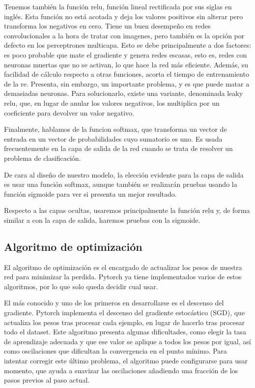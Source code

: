 Tenemos también la función relu, función lineal rectificada por sus
siglas en inglés. Esta función no está acotada y deja los valores
positivos sin alterar pero transforma los negativos en cero. Tiene un
buen desempeño en redes convolucionales a la hora de tratar con
imagenes, pero también es la opción por defecto en los perceptrones
multicapa. Esto se debe principalmente a dos factores: es poco probable
que mate el gradiente y genera redes escasas, esto es, redes con
neuronas muertas que no se activan, lo que hace la red más eficiente.
Además, su facilidad de cálculo respecto a otras funciones, acorta el
tiempo de entrenamiento de la re. Presenta, sin embargo, un importante
problema, y es que puede matar a demasiadas neuronas. Para solucionarlo,
existe una variante, denominada leaky relu, que, en lugar de anular los
valores negativos, los multiplica por un coeficiente para devolver un
valor negativo.

Finalmente, hablamos de la funcion softmax, que transforma un vector de
entrada en un vector de probabilidades cuyo sumatorio es uno. Es usada
frecuentemente en la capa de salida de la red cuando se trata de
resolver un problema de clasificación.

De cara al diseño de nuestro modelo, la elección evidente para la capa
de salida es usar una función softmax, aunque también se realizarán
pruebas usando la función sigmoide para ver si presenta un mejor
resultado.

Respecto a las capas ocultas, usaremos principalmente la función relu y,
de forma similar a con la capa de salida, haremos pruebas con la
sigmoide.

\subsection{Algoritmo de optimización}\label{algoritmo-de-optimizacion}

El algoritmo de optimización es el encargado de actualizar los pesos de
nuestra red para minimizar la perdida. Pytorch ya tiene implementados
varios de estos algoritmos, por lo que solo queda decidir cual usar.

El más conocido y uno de los primeros en desarrollarse es el descenso
del gradiente. Pytorch implementa el descenso del gradiente estocástico
(SGD), que actualiza los pesos tras procesar cada ejemplo, en lugar de
hacerlo tras procesar todo el dataset. Este algoritmo presenta algunas
dificultades, como elegir la tasa de aprendizaje adecuada y que ese
valor se aplique a todos los pesos por igual, así como oscilaciones que
dificultan la convergencia en el punto mínimo. Para intentar corregir
este último problema, el algoritmo puede configurarse para usar momento,
que ayuda a suavizar las oscilaciones añadiendo una fracción de los
pasos previos al paso actual.

